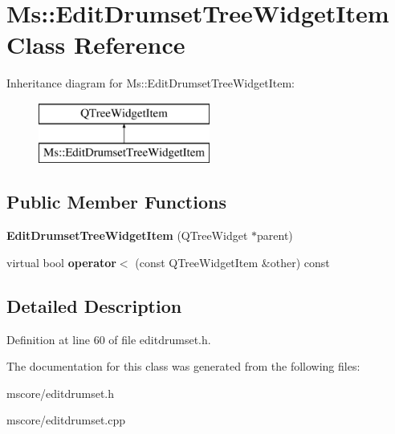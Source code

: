 \hypertarget{class_ms_1_1_edit_drumset_tree_widget_item}{}\section{Ms\+:\+:Edit\+Drumset\+Tree\+Widget\+Item Class Reference}
\label{class_ms_1_1_edit_drumset_tree_widget_item}
Inheritance diagram for Ms\+:\+:Edit\+Drumset\+Tree\+Widget\+Item\+:\begin{figure}[H]
\begin{center}
\leavevmode
\includegraphics[height=2.000000cm]{class_ms_1_1_edit_drumset_tree_widget_item}
\end{center}
\end{figure}
\subsection*{Public Member Functions}
\begin{DoxyCompactItemize}
\item 
\mbox{\label{class_ms_1_1_edit_drumset_tree_widget_item_a36f84e43b96fc91132dd4ac6e3259050}} 
{\bfseries Edit\+Drumset\+Tree\+Widget\+Item} (Q\+Tree\+Widget $\ast$parent)
\item 
\mbox{\label{class_ms_1_1_edit_drumset_tree_widget_item_a8f8e18559976bb7e3ac0ede2bf2d52db}} 
virtual bool {\bfseries operator$<$} (const Q\+Tree\+Widget\+Item \&other) const
\end{DoxyCompactItemize}


\subsection{Detailed Description}


Definition at line 60 of file editdrumset.\+h.



The documentation for this class was generated from the following files\+:\begin{DoxyCompactItemize}
\item 
mscore/editdrumset.\+h\item 
mscore/editdrumset.\+cpp\end{DoxyCompactItemize}
